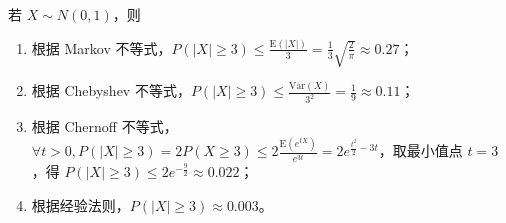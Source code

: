 \documentclass[../main.tex]{subfiles}
\begin{document}
\begin{example}
    若 $X\sim N(0,1)$，则
    \begin{enumerate}
        \item 根据 Markov 不等式，$P(|X|\geq3)\leq\frac{\mathrm E(|X|)}3=\frac13\sqrt{\frac2\pi}\approx 0.27$；
        \item 根据 Chebyshev 不等式，$P(|X|\geq3)\leq\frac{\mathrm{Var}(X)}{3^2}=\frac19\approx 0.11$；
        \item 根据 Chernoff 不等式，$\forall t>0,P(|X|\geq3)=2P(X\geq3)\leq2\frac{\mathrm E(e^{tX})}{e^{3t}}=2e^{\frac{t^2}2-3t}$，取最小值点 $t=3$，得 $P(|X|\geq3)\leq 2e^{-\frac92}\approx 0.022$；
        \item 根据经验法则，$P(|X|\geq3)\approx 0.003$。
    \end{enumerate}
\end{example}
\end{document}
